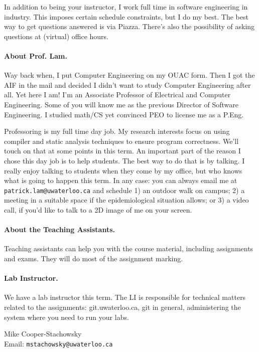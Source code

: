 In addition to being your instructor, I work full time in software engineering in industry. This imposes certain schedule constraints, but I do my best. The best way to get questions answered is via Piazza. There's also the possibility of asking questions at (virtual) office hours.

\paragraph{About Prof. Lam.}
Way back when, I put Computer Engineering on my OUAC form. Then I got the AIF in the mail and decided I didn't want to study Computer Engineering after all. Yet here I am! I'm an Associate Professor of Electrical and Computer Engineering. Some of you will know me as the previous Director of Software Engineering. I studied math/CS yet convinced PEO to license me as a P.Eng.

Professoring is my full time day job. My research interests focus on using compiler and static analysis techniques to ensure program correctness. We'll touch on that at some points in this term. An important part of the reason I chose this day job is to help students. The best way to do that is by talking. I really enjoy talking to students when they come by my office, but who knows what is going to happen this term. In any case: you can always email me at {\tt patrick.lam@uwaterloo.ca} and schedule 1) an outdoor walk on campus; 2) a meeting in a suitable space if the epidemiological situation allows; or 3) a video call, if you'd like to talk to a 2D image of me on your screen.

\paragraph{About the Teaching Assistants.}

Teaching assistants can help you with the course material, including assignments and exams. They will do most of the assignment marking.

\paragraph{Lab Instructor.}
We have a lab instructor this term. The LI is responsible for technical matters related to the assignments: git.uwaterloo.ca, git in general, administering the system where you need to run your labs.

\noindent
\hspace*{2em} \begin{minipage}{.4\textwidth}
Mike Cooper-Stachowsky\\
Email: {\tt mstachowsky@uwaterloo.ca}
\end{minipage}

